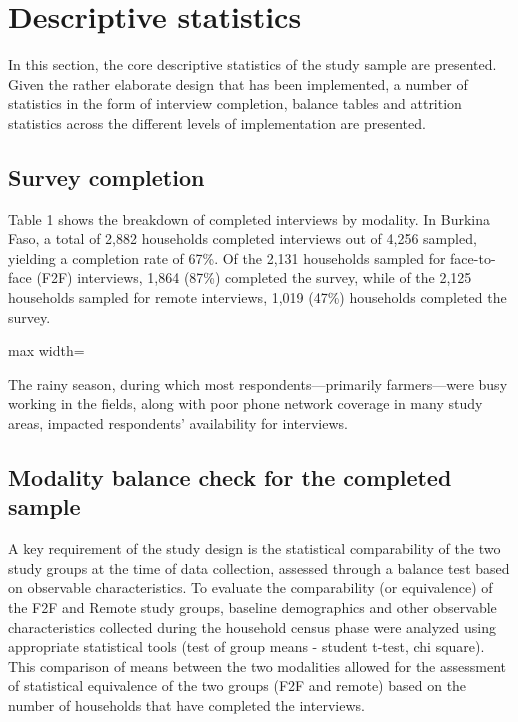 \documentclass[11pt,harvard]{article}
\begin{document}
	
	\section{Descriptive statistics}
	
	In this section, the core descriptive statistics of the study sample are presented. Given the rather elaborate design that has been implemented, a number of statistics in the form of interview completion, balance tables and attrition statistics across the different levels of implementation are presented.
	
	\subsection{Survey completion}
	
	Table 1 shows the breakdown of completed interviews by modality. In Burkina Faso, a total of 2,882 households completed interviews out of 4,256 sampled, yielding a completion rate of 67\%. Of the 2,131 households sampled for face-to-face (F2F) interviews, 1,864 (87\%) completed the survey, while of the 2,125 households sampled for remote interviews, 1,019 (47\%) households completed the survey.
	 
	\begin{table}[htbp]
		\centering
		\begin{adjustbox}{max width=\textwidth}
			\begin{threeparttable}
				\caption{Sample Completion: Face-to-Face vs. Remote}
				\small
				 
				\label{tab:BF_rCARI_Completion}
			\end{threeparttable}
		\end{adjustbox}
	\end{table}
	
	The rainy season, during which most respondents—primarily farmers—were busy working in the fields, along with poor phone network coverage in many study areas, impacted respondents’ availability for interviews.
	
	
	\subsection{Modality balance check for the completed sample}

	A key requirement of the study design is the statistical comparability of the two study groups at the time of data collection, assessed through a balance test based on observable characteristics. To evaluate the comparability (or equivalence) of the F2F and Remote study groups, baseline demographics and other observable characteristics collected during the household census phase were analyzed using appropriate statistical tools (test of group means - student t-test, chi square). This comparison of means between the two modalities allowed for the assessment of statistical equivalence of the two groups (F2F and remote) based on the number of households that have completed the interviews. 
	
\end{document}

